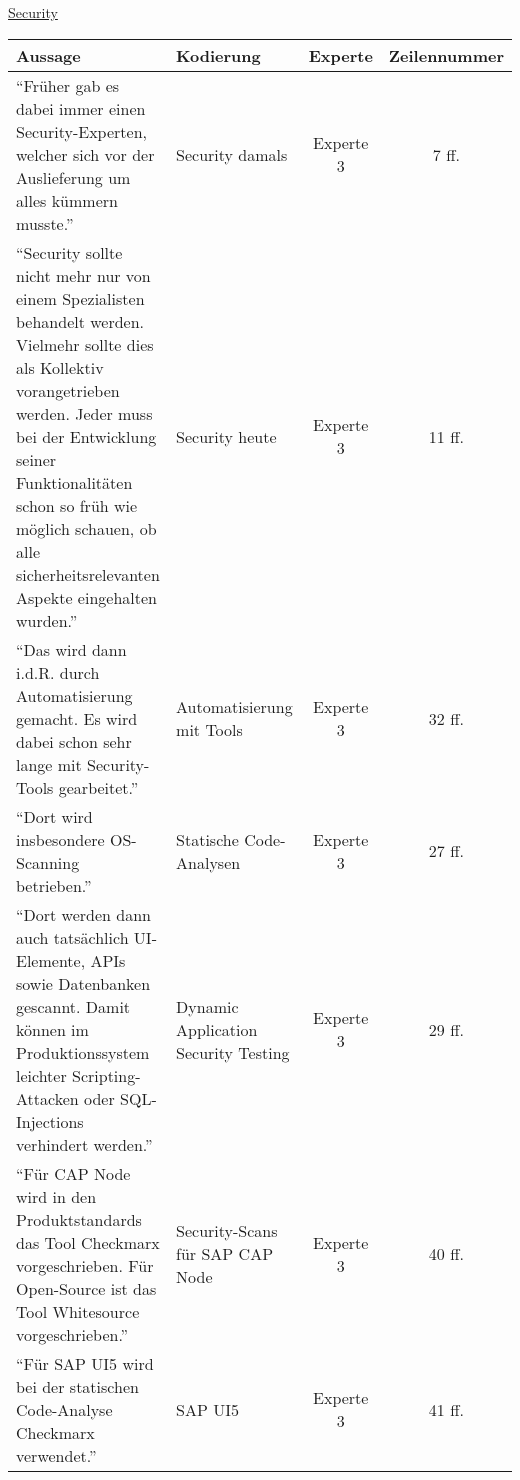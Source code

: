 \newpage
    \underline{Security}\\
    \begin{longtable}{ |C{6cm}|C{3cm}|c|c| }
        \hline
        Aussage & Kodierung & Experte & Zeilennummer\\
        \hline
        \enquote{Früher gab es dabei immer einen Security-Experten, welcher sich vor der Auslieferung um alles kümmern musste.} & Security damals & Experte 3 & 7 ff. \\
        \hline
        \enquote{Security sollte nicht mehr nur von einem Spezialisten behandelt werden. Vielmehr sollte dies als Kollektiv vorangetrieben werden. Jeder muss bei der Entwicklung seiner Funktionalitäten schon so früh wie möglich schauen, ob alle sicherheitsrelevanten Aspekte eingehalten wurden.} & Security heute  & Experte 3 & 11 ff. \\
        \hline

        \enquote{Das wird dann i.d.R. durch Automatisierung gemacht. Es wird dabei schon sehr lange mit Security-Tools gearbeitet.} & Automatisierung mit Tools  & Experte 3 & 32 ff. \\
        \hline
        \enquote{Dort wird insbesondere OS-Scanning betrieben.} & Statische Code-Analysen  & Experte 3 & 27 ff. \\
        \hline
        \enquote{Dort werden dann auch tatsächlich UI-Elemente, APIs sowie Datenbanken gescannt. Damit können im Produktionssystem leichter Scripting-Attacken oder SQL-Injections verhindert werden.} & Dynamic Application Security Testing & Experte 3 & 29 ff. \\
        \hline
        \enquote{Für CAP Node wird in den Produktstandards das Tool Checkmarx vorgeschrieben. Für Open-Source ist das Tool Whitesource vorgeschrieben.} & Security-Scans für SAP CAP Node  & Experte 3 & 40 ff. \\
        \hline
        \enquote{Für SAP UI5 wird bei der statischen Code-Analyse Checkmarx verwendet.} & SAP UI5  & Experte 3 & 41 ff. \\
        \hline
        \end{longtable}


        \newpage
